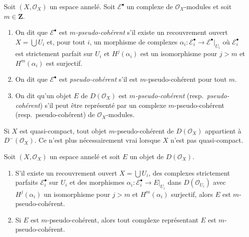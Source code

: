 {\begin{definition}

\label{definition-pseudo-coherent}

Soit $(X, \mathcal{O}_X)$ un espace annelé. Soit $\mathcal{E}^\bullet$
un complexe de $\mathcal{O}_X$-modules et soit $m \in \mathbf{Z}$.

\begin{enumerate}

\item On dit que $\mathcal{E}^\bullet$ est {\it $m$-pseudo-cohérent}
s'il existe un recouvrement ouvert $X = \bigcup U_i$ et, pour tout $i$,
un morphisme de complexes
$\alpha_i : \mathcal{E}_i^\bullet \to \mathcal{E}^\bullet|_{U_i}$
où $\mathcal{E}_i^\bullet$ est strictement parfait sur $U_i$ et
$H^j(\alpha_i)$ est un isomorphisme pour $j > m$ et $H^m(\alpha_i)$
est surjectif.
\item On dit que $\mathcal{E}^\bullet$ est {\it pseudo-cohérent}
s'il est $m$-pseudo-cohérent pour tout $m$.
\item On dit qu'un objet $E$ de $D(\mathcal{O}_X)$ est
{\it $m$-pseudo-cohérent} (resp.\ {\it pseudo-cohérent}) s'il peut être représenté par un complexe $m$-pseudo-cohérent (resp.\ pseudo-cohérent) de $\mathcal{O}_X$-modules.

\end{enumerate}

\end{definition}

\noindent
Si $X$ est quasi-compact, tout objet $m$-pseudo-cohérent de $D(\mathcal{O}_X)$ appartient à $D^-(\mathcal{O}_X)$. Ce n'est plus nécessairement vrai lorsque $X$ n'est pas quasi-compact.

\begin{lemma}

\label{lemma-pseudo-coherent-independent-representative}

Soit $(X, \mathcal{O}_X)$ un espace annelé et soit $E$ un objet de $D(\mathcal{O}_X)$.

\begin{enumerate}

\item S'il existe un recouvrement ouvert $X = \bigcup U_i$, des complexes strictement parfaits $\mathcal{E}_i^\bullet$ sur $U_i$ et des morphismes $\alpha_i : \mathcal{E}_i^\bullet \to E|_{U_i}$ dans
$D(\mathcal{O}_{U_i})$ avec $H^j(\alpha_i)$ un isomorphisme pour $j > m$
et $H^m(\alpha_i)$ surjectif, alors $E$ est $m$-pseudo-cohérent.
\item Si $E$ est $m$-pseudo-cohérent, alors tout complexe représentant
$E$ est $m$-pseudo-cohérent.


\end{enumerate}
\end{lemma}}
